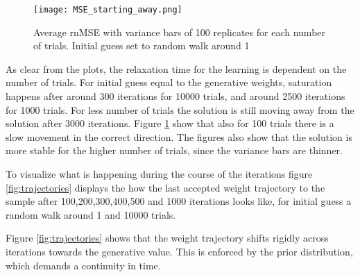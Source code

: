 \begin{figure}[hbt!]
\caption{Average rnMSE with variance bars of 100 replicates for each number of trials. Initial guess set to random walk around 1}
\label{fig:MSE2}
    \centering
    \texttt{[image: MSE\_starting\_away.png]}
\end{figure}

As clear from the plots, the relaxation time for the learning is dependent on the number of trials. For initial guess equal to the generative weights, saturation happens after around 300 iterations for 10000 trials, and around 2500 iterations for 1000 trials. For less number of trials the solution is still moving away from the solution after 3000 iterations. Figure \ref{fig:MSE2} show that also for 100 trials there is a slow movement in the correct direction. The figures also show that the solution is more stable for the higher number of trials, since the variance bars are thinner.  

To visualize what is happening during the course of the iterations figure \ref{fig:trajectories} displays the how the last accepted weight trajectory to the sample after 100,200,300,400,500 and 1000 iterations looks like, for initial guess a random walk around 1 and 10000 trials. 

Figure \ref{fig:trajectories} shows that the weight trajectory shifts rigidly across iterations towards the generative value. This is enforced by the prior distribution, which demands a continuity in time.

\newpage



